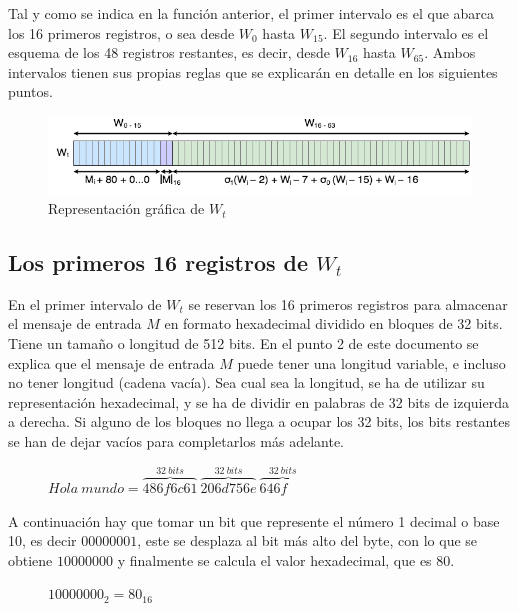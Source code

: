 \documentclass{article}
\begin{document}
    Tal y como se indica en la función anterior, el primer intervalo es el que abarca los 16 primeros registros, o sea desde $W_{0}$ hasta $W_{15}$. El segundo intervalo es el esquema de los 48 registros restantes, es decir, desde $W_{16}$ hasta $W_{65}$. Ambos intervalos tienen sus propias reglas que se explicarán en detalle en los siguientes puntos.
        \begin{figure}[H]
        \centering
            \includegraphics[scale=0.5]{img/SHA-256-Wt.png}
            \caption{Representación gráfica de $W_{t}$}
        \end{figure}

    \subsection{Los primeros 16 registros de $W_t$}
        En el primer intervalo de $W_{t}$ se reservan los 16 primeros registros para almacenar el mensaje de entrada $M$ en formato hexadecimal dividido en bloques de 32 bits. Tiene un tamaño o longitud de 512 bits. En el punto 2 de este documento se explica que el mensaje de entrada $M$ puede tener una longitud variable, e incluso no tener longitud (cadena vacía). Sea cual sea la longitud, se ha de utilizar su representación hexadecimal, y se ha de dividir en palabras de 32 bits de izquierda a derecha. Si alguno de los bloques no llega a ocupar los 32 bits, los bits restantes se han de dejar vacíos para completarlos más adelante.
            \begin{figure}[H]
            \centering
                $Hola \ mundo = \overbrace{486f6c61}^{32 \ bits} \ \overbrace{206d756e}^{32 \ bits} \ \overbrace{646f \ \ \ \ \ \ }^{32 \ bits}$
            \end{figure}
        
        A continuación hay que tomar un bit que represente el número 1 decimal o base 10, es decir $00000001$, este se desplaza al bit más alto del byte, con lo que se obtiene $10000000$ y finalmente se calcula el valor hexadecimal, que es $80$.
            \begin{figure}[H]
            \centering
                $10000000_{2} = 80_{16}$
            \end{figure}
        
\end{document}
